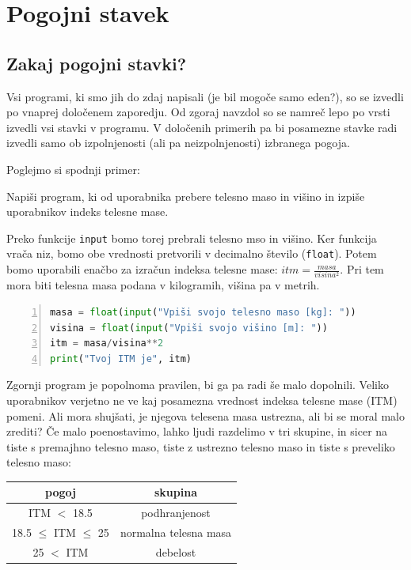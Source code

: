 \chapter{Pogojni stavek}

\section{Zakaj pogojni stavki?}

Vsi programi, ki smo jih do zdaj napisali (je bil mogoče samo eden?), so se izvedli po vnaprej določenem zaporedju. Od zgoraj navzdol so se namreč lepo po vrsti izvedli vsi stavki v programu. V določenih primerih pa bi posamezne stavke radi izvedli samo ob izpolnjenosti (ali pa neizpolnjenosti) izbranega pogoja. 

Poglejmo si spodnji primer:
\begin{zgled}
Napiši program, ki od uporabnika prebere telesno maso in višino in izpiše uporabnikov indeks telesne mase.
\end{zgled}
\begin{resitev}
Preko funkcije \texttt{input} bomo torej prebrali telesno mso in višino. Ker funkcija vrača niz, bomo obe vrednosti pretvorili v decimalno število (\texttt{float}). Potem bomo uporabili enačbo za izračun indeksa telesne mase: $itm = \frac{masa}{visina^2}$. Pri tem mora biti telesna masa podana v kilogramih, višina pa v metrih.
\begin{lstlisting}[language=Python, showstringspaces=false,numbers=left]
masa = float(input("Vpiši svojo telesno maso [kg]: "))
visina = float(input("Vpiši svojo višino [m]: "))
itm = masa/visina**2
print("Tvoj ITM je", itm)
\end{lstlisting}
\end{resitev}

Zgornji program je popolnoma pravilen, bi ga pa radi še malo dopolnili. Veliko uporabnikov verjetno ne ve kaj posamezna vrednost indeksa telesne mase (ITM) pomeni. Ali mora shujšati, je njegova telesena masa ustrezna, ali bi se moral malo zrediti? Če malo poenostavimo, lahko ljudi razdelimo v tri skupine, in sicer na tiste s premajhno telesno maso, tiste z ustrezno telesno maso in tiste s preveliko telesno maso:

\begin{tabular}{c|c}
     pogoj & skupina \\
     \hline
     ITM $<$ 18.5 & podhranjenost\\
     18.5 $\leq$ ITM $\leq$ 25 & normalna telesna masa\\
     25 $<$ ITM & debelost
\end{tabular}

